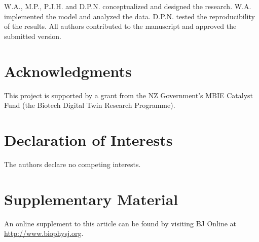 \documentclass{biophys-new}
\begin{document}
W.A., M.P., P.J.H. and D.P.N. conceptualized and designed the research. W.A. implemented the model and analyzed the data. D.P.N. tested the reproducibility of the results. All authors contributed to the manuscript and approved the submitted version.

\section*{Acknowledgments}

This project is supported by a grant from the NZ Government’s MBIE Catalyst Fund (the Biotech Digital Twin Research Programme).

\section*{Declaration of Interests}

The authors declare no competing interests.




\section*{Supplementary Material}

An online supplement to this article can be found by visiting BJ Online at \url{http://www.biophysj.org}.
\end{document}
